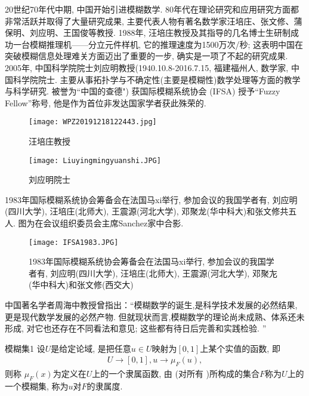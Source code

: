 20世纪70年代中期, 中国开始引进模糊数学.
80年代在理论研究和应用研究方面都非常活跃并取得了大量研究成果, 主要代表人物有著名数学家汪培庄、张文修、蒲保明、刘应明、王国俊等教授.
1988年, 汪培庄教授及其指导的几名博士生研制成功一台模糊推理机——分立元件样机, 它的推理速度为1500万次/秒; 这表明中国在突破模糊信息处理难关方面迈出了重要的一步, 确实是一项了不起的研究成果.
2005年, 中国科学院院士刘应明教授(1940.10.8-2016.7.15, 福建福州人, 数学家, 中国科学院院士.
主要从事拓扑学与不确定性(主要是模糊性)数学处理等方面的教学与科学研究. 被誉为“中国的查德") 获国际模糊系统协会 (IFSA) 授予“Fuzzy Fellow”称号, 他是作为首位非发达国家学者获此殊荣的.
\begin{figure}[H]
    \centering
    \texttt{[image: WPZ20191218122443.jpg]}
    \caption{汪培庄教授}
    \label{WPZ20191218122443}
\end{figure}
\begin{figure}[H]
    \centering
    \texttt{[image: Liuyingmingyuanshi.JPG]}
    \caption{刘应明院士}
    \label{WPZ20191218122443}
\end{figure}
1983年国际模糊系统协会筹备会在法国马xi举行, 参加会议的我国学者有, 刘应明(四川大学), 汪培庄(北师大), 王震源(河北大学), 邓聚龙(华中科大)和张文修共五人. 图为在会议组织委员会主席Sanchez家中合影.
\begin{figure}[H]
    \centering
    \texttt{[image: IFSA1983.JPG]}
    \caption{1983年国际模糊系统协会筹备会在法国马xi举行, 参加会议的我国学者有, 刘应明(四川大学), 汪培庄(北师大), 王震源(河北大学), 邓聚㔫(华中科大)和张文修(西交大)}
    \label{WPZ20191218122443}
\end{figure}
\begin{remark}
    中国著名学者周海中教授曾指出：“模糊数学的诞生,是科学技术发展的必然结果, 更是现代数学发展的必然产物. 但就现状而言,模糊数学的理论尚未成熟、体系还未形成, 对它也还存在不同看法和意见; 这些都有待日后完善和实践检验. ”
\end{remark}
\begin{mydef}{模糊集}{1}
设$U$是给定论域,   是把任意$u\in U$映射为$[0, 1]$上某个实值的函数, 即
\begin{align}
    U\rightarrow [0, 1], u\rightarrow \mu_F(u),
\end{align}
则称 $ \mu_F(x)$为定义在$U$上的一个隶属函数, 由   (对所有    )所构成的集合$F$称为$U$上的一个模糊集, 称为$u$对$F$的隶属度.
\end{mydef}


